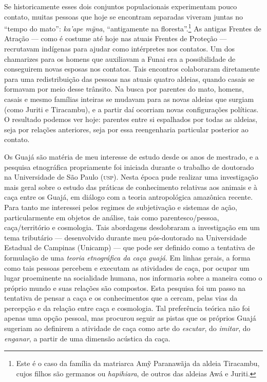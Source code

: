 Se historicamente esses dois conjuntos
populacionais experimentam pouco contato, muitas pessoas que hoje se
encontram separadas viveram juntas no ``tempo do mato'': \textit{ka'ape
mỹna}, ``antigamente na floresta''.\footnote{Este é o caso da família da
  matriarca Amỹ Paranawãja da aldeia Tiracambu, cujos filhos são
  germanos ou \textit{hapihiara}, de outros das aldeias Awá e Juriti.} As
antigas Frentes de Atração --- como é costume até hoje nas atuais Frentes
de Proteção --- recrutavam indígenas para ajudar como intérpretes nos
contatos. Um dos chamarizes para os homens que auxiliavam a Funai era a
possibilidade de conseguirem novas esposas nos contatos. Tais encontros
colaboraram diretamente para uma redistribuição das pessoas nas atuais
quatro aldeias, quando casais se formavam por meio desse trânsito. Na
busca por parentes do mato, homens, casais e mesmo famílias inteiras se
mudavam para as novas aldeias que surgiam (como Juriti e Tiracambu), e a
partir daí ocorriam novas configurações políticas. O resultado podemos
ver hoje: parentes entre si espalhados por todas as aldeias, seja por
relações anteriores, seja por essa reengenharia particular posterior ao
contato.


Os Guajá são matéria de meu interesse de estudo desde os anos de
mestrado, e a pesquisa etnográfica propriamente foi iniciada durante o
trabalho de doutorado na Universidade de São Paulo (\textsc{usp}). Nesta época
pude realizar uma investigação mais geral sobre o estudo das práticas de
conhecimento relativas aos animais e à caça entre os Guajá, em diálogo
com a teoria antropológica amazônica recente. Para tanto me interessei
pelos regimes de subjetivação e sistemas de ação, particularmente em
objetos de análise, tais como parentesco/pessoa, caça/território e
cosmologia. Tais abordagens desdobraram a investigação em um tema
tributário --- desenvolvido durante meu pós-doutorado na Universidade
Estadual de Campinas (Unicamp) --- que pode ser definido como a tentativa
de formulação de uma \textit{teoria etnográfica da caça guajá}. Em linhas
gerais, a forma como tais pessoas percebem e executam as atividades de
caça, por ocupar um lugar proeminente na socialidade humana, nos
informaria sobre a maneira como o próprio mundo e suas relações são
compostos. Esta pesquisa foi um passo na tentativa de pensar a caça e os
conhecimentos que a cercam, pelas vias da percepção e da relação entre
caça e cosmologia. Tal preferência teórica não foi apenas uma opção
pessoal, mas procurou seguir as pistas que os próprios Guajá sugeriam ao
definirem a atividade de caça como arte do \textit{escutar}, do \textit{imitar}, do
\textit{enganar}, a partir de uma dimensão acústica da caça.

